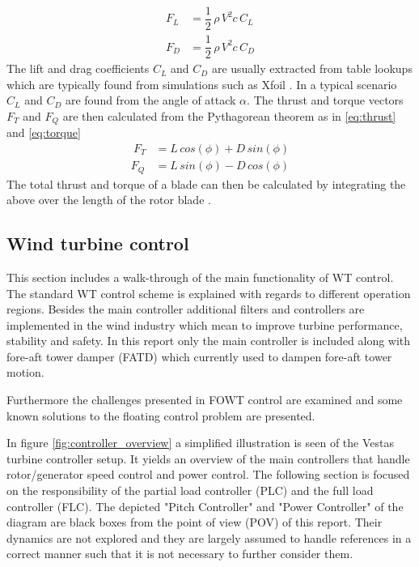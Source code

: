 \begin{align}
	F_L &= \dfrac{1}{2}\,  \rho \, V^2 c \, C_L \label{eq:lift}\\
	F_D &= \dfrac{1}{2} \, \rho \, V^2 c \, C_D \label{eq:drag}
\end{align}
The lift and drag coefficients $ C_L $ and $ C_D $ are usually extracted from table lookups which are typically found from simulations such as Xfoil
. 
In a typical scenario $ C_L $ and $ C_D $ are found from the angle of attack $ \alpha $. The thrust and torque vectors $ F_T $ and $ F_Q $ are then calculated from the Pythagorean theorem as in \cref{eq:thrust} and \cref{eq:torque}
\begin{align}\
	F_T &= L \, cos(\phi) + D \, sin(\phi) \label{eq:thrust} \\
	F_Q &= L \, sin(\phi) - D \, cos(\phi) \label{eq:torque}
\end{align}
The total thrust and torque of a blade can then be calculated by integrating the above over the length of the rotor blade \cite{Knudsen2013}.


\subsection{Wind turbine control} \label{sec:theory_ctrl}
This section includes a walk-through of the main functionality of WT control. The standard WT control scheme is explained with regards to different operation regions. Besides the main controller additional filters and controllers are implemented in the wind industry which mean to improve turbine performance, stability and safety. In this report only the main controller is included along with fore-aft tower damper (FATD) which currently used to dampen fore-aft tower motion.

Furthermore the challenges presented in FOWT control are examined and some known solutions to the floating control problem are presented.

\medskip
In figure \cref{fig:controller_overview} a simplified illustration is seen of the Vestas turbine controller setup. It yields an overview of the main controllers that handle rotor/generator speed control and power control. The following section is focused on the responsibility of the partial load controller (PLC) and the full load controller (FLC). The depicted "Pitch Controller" and "Power Controller" of the diagram are black boxes from the point of view (POV) of this report. Their dynamics are not explored and they are largely assumed to handle references in a correct manner such that it is not necessary to further consider them. 

